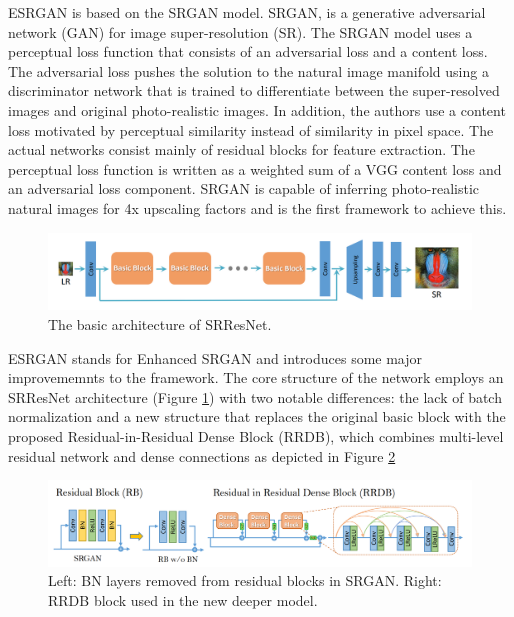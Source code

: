 ESRGAN is based on the SRGAN\cite{ledig2017photorealistic} model. SRGAN, is a generative adversarial network (GAN) for image super-resolution (SR). The SRGAN model uses a perceptual loss function that consists of an adversarial loss and a content loss. The adversarial loss pushes the solution to the natural image manifold using a discriminator network that is trained to differentiate between the super-resolved images and original photo-realistic images. In addition, the authors use a content loss motivated by perceptual similarity instead of similarity in pixel space. The actual networks consist mainly of residual blocks for feature extraction. The perceptual loss function is written as a weighted sum of a VGG content loss and an adversarial loss component. SRGAN is capable of inferring photo-realistic natural images for 4x upscaling factors and is the first framework to achieve this.

\begin{figure}[H]
  \centering
  \includegraphics[scale=0.25]{figures/SRResNet.png}
  \caption{The basic architecture of SRResNet.}
  \label{img:SRResNet}
\end{figure}

ESRGAN stands for Enhanced SRGAN and introduces some major improvememnts to the framework. The core structure of the network employs an SRResNet architecture (Figure \ref{img:SRResNet}) with two notable differences: the lack of batch normalization and a new structure that replaces the original basic block with the proposed Residual-in-Residual Dense Block (RRDB), which combines multi-level residual network and dense
connections as depicted in Figure \ref{img:RRDB}

\begin{figure}[H]
  \centering
  \includegraphics[scale=0.25]{figures/RRDB.png}
  \caption{Left: BN layers removed from residual blocks in SRGAN. Right: RRDB block used in the new deeper model.}
  \label{img:RRDB}
\end{figure}


